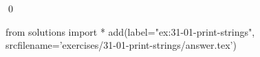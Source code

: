 
\begin{ex}
  \label{ex:31-01-print-strings}
  
  \qed
\end{ex}
\begin{python0}
from solutions import *
add(label="ex:31-01-print-strings",
    srcfilename='exercises/31-01-print-strings/answer.tex')
\end{python0}
